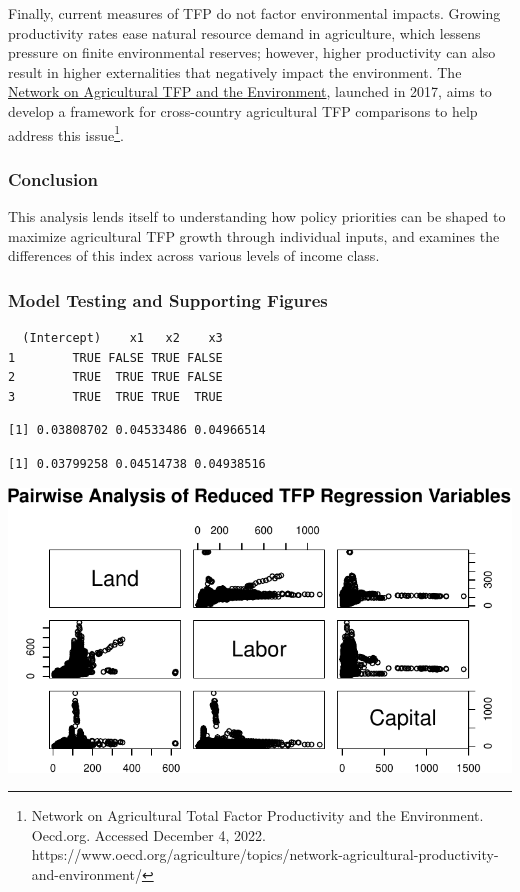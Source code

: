 \documentclass[
  letterpaper,
  DIV=11,
  numbers=noendperiod]{scrartcl}
\begin{document}
Finally, current measures of TFP do not factor environmental impacts.
Growing productivity rates ease natural resource demand in agriculture,
which lessens pressure on finite environmental reserves; however, higher
productivity can also result in higher externalities that negatively
impact the environment. The
\href{https://www.oecd.org/agriculture/topics/network-agricultural-productivity-and-environment/}{Network
on Agricultural TFP and the Environment}, launched in 2017, aims to
develop a framework for cross-country agricultural TFP comparisons to
help address this issue\footnote{Network on Agricultural Total Factor
  Productivity and the Environment. Oecd.org. Accessed December 4, 2022.
  https://www.oecd.org/agriculture/topics/network-agricultural-productivity-and-environment/}.

\hypertarget{conclusion}{%
\subsubsection{Conclusion}\label{conclusion}}

This analysis lends itself to understanding how policy priorities can be
shaped to maximize agricultural TFP growth through individual inputs,
and examines the differences of this index across various levels of
income class.

\hypertarget{model-testing-and-supporting-figures}{%
\subsubsection{Model Testing and Supporting
Figures}\label{model-testing-and-supporting-figures}}

\begin{verbatim}
  (Intercept)    x1   x2    x3
1        TRUE FALSE TRUE FALSE
2        TRUE  TRUE TRUE FALSE
3        TRUE  TRUE TRUE  TRUE
\end{verbatim}

\begin{verbatim}
[1] 0.03808702 0.04533486 0.04966514
\end{verbatim}

\begin{verbatim}
[1] 0.03799258 0.04514738 0.04938516
\end{verbatim}

\includegraphics{Smith_Gabrielle_EDS222Final_files/figure-pdf/unnamed-chunk-9-1.pdf}
\end{document}
